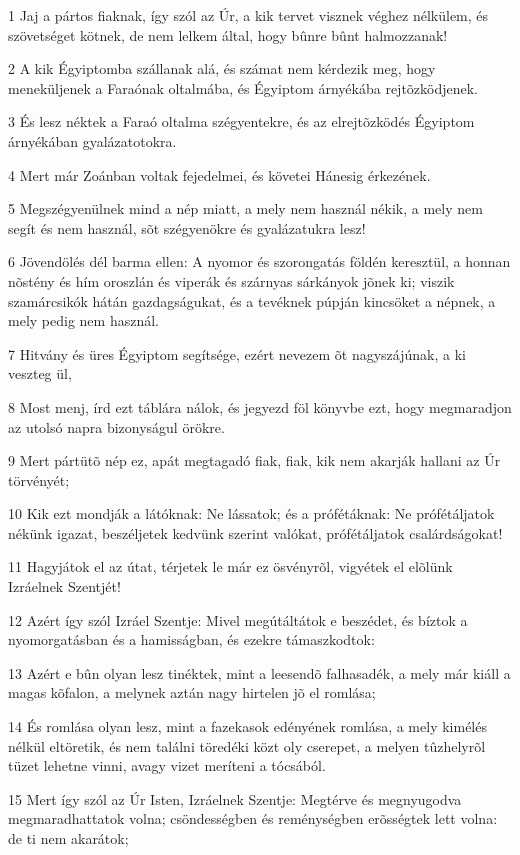 \par 1 Jaj a pártos fiaknak, így szól az Úr, a kik tervet visznek véghez nélkülem, és szövetséget kötnek, de nem lelkem által, hogy bûnre bûnt halmozzanak!
\par 2 A kik Égyiptomba szállanak alá, és számat nem kérdezik meg, hogy meneküljenek a Faraónak oltalmába, és Égyiptom árnyékába rejtõzködjenek.
\par 3 És lesz néktek a Faraó oltalma szégyentekre, és az elrejtõzködés Égyiptom árnyékában gyalázatotokra.
\par 4 Mert már Zoánban voltak fejedelmei, és követei Hánesig érkezének.
\par 5 Megszégyenülnek mind a nép miatt, a mely nem használ nékik, a mely nem segít és nem használ, sõt szégyenökre és gyalázatukra lesz!
\par 6 Jövendölés dél barma ellen: A nyomor és szorongatás földén keresztül, a honnan nõstény és hím oroszlán és viperák és szárnyas sárkányok jõnek ki; viszik szamárcsikók hátán gazdagságukat, és a tevéknek púpján kincsöket a népnek, a mely pedig nem használ.
\par 7 Hitvány és üres Égyiptom segítsége, ezért nevezem õt nagyszájúnak, a ki veszteg ül,
\par 8 Most menj, írd ezt táblára nálok, és jegyezd föl könyvbe ezt, hogy megmaradjon az utolsó napra bizonyságul örökre.
\par 9 Mert pártütõ nép ez, apát megtagadó fiak, fiak, kik nem akarják hallani az Úr törvényét;
\par 10 Kik ezt mondják a látóknak: Ne lássatok; és a prófétáknak: Ne prófétáljatok nékünk igazat, beszéljetek kedvünk szerint valókat, prófétáljatok csalárdságokat!
\par 11 Hagyjátok el az útat, térjetek le már ez ösvényrõl, vigyétek el elõlünk Izráelnek Szentjét!
\par 12 Azért így szól Izráel Szentje: Mivel megútáltátok e beszédet, és bíztok a nyomorgatásban és a hamisságban, és ezekre támaszkodtok:
\par 13 Azért e bûn olyan lesz tinéktek, mint a leesendõ falhasadék, a mely már kiáll a magas kõfalon, a melynek aztán nagy hirtelen jõ el romlása;
\par 14 És romlása olyan lesz, mint a fazekasok edényének romlása, a mely kimélés nélkül eltöretik, és nem találni töredéki közt oly cserepet, a melyen tûzhelyrõl tüzet lehetne vinni, avagy vizet meríteni a tócsából.
\par 15 Mert így szól az Úr Isten, Izráelnek Szentje: Megtérve és megnyugodva megmaradhattatok volna; csöndességben és reménységben erõsségtek lett volna: de ti nem akarátok;
